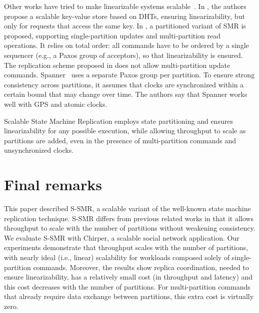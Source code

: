 \documentclass[11pt]{article}
\begin{document}
Other works have tried to make linearizable systems scalable~\cite{corbett2013spanner, Glendenning2011, Marandi11}.
In \cite{Glendenning2011}, the authors propose a scalable key-value store based on DHTs, ensuring linearizability, but only for requests that access the same key.
In \cite{Marandi11}, a partitioned variant of SMR is proposed, supporting single-partition updates and multi-partition read operations.
It relies on total order: all commands have to be ordered by a single sequencer (e.g., a Paxos group of acceptors), so that linearizability is ensured.
The replication scheme proposed in \cite{Marandi11} does not allow multi-partition update commands.
Spanner~\cite{corbett2013spanner} uses a separate Paxos group per partition.
To ensure strong consistency across partitions, it assumes that clocks are synchronized within a certain bound that may change over time.
The authors say that Spanner works well with GPS and atomic clocks.

Scalable State Machine Replication employs state partitioning and ensures linearizability for any possible execution, while allowing throughput to scale as partitions are added, even in the presence of multi-partition commands and unsynchronized clocks.

\section{Final remarks}
\label{sec:final}

This paper described S-SMR, a scalable variant of the well-known state machine replication technique.
S-SMR differs from previous related works in that it allows throughput to scale with the number of partitions without weakening consistency.
We evaluate S-SMR with Chirper, a scalable social network application.
Our experiments demonstrate that throughput scales with the number of partitions, with nearly ideal (i.e., linear) scalability for workloads composed solely of single-partition commands.
Moreover, the results show replica coordination, needed to ensure linearizability, has a relatively small cost (in throughput and latency) and this cost decreases with the number of partitions.
For multi-partition commands that already require data exchange between partitions, this extra cost is virtually zero.



\end{document}
